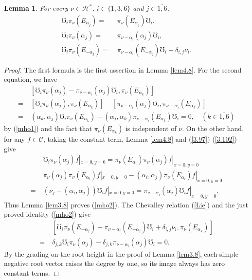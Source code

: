\documentclass[12pt]{article}
\numberwithin{equation}{section}
\newtheorem{lemma}[theorem]{Lemma}
\theoremstyle{definition}
\theoremstyle{remark}
\begin{document}
\begin{lemma}
	For every $\nu\in \mathscr{H}^*$, $i\in\{1,3,6\}$ and $j\in\overline{1,6}$,
	\begin{align}
		\mho_i\pi_{\nu}(E_{\alpha_j})=&\;\pi_{\nu}(E_{\alpha_j})\mho_i,\label{mho1}\\
		\mho_i\pi_{\nu}(\alpha_j)=&\;\pi_{\nu-\alpha_i}(\alpha_j)\mho_i,\label{mho2}\\
		\mho_i\pi_{\nu}(E_{-\alpha_j})=&\;\pi_{\nu-\alpha_i}(E_{-\alpha_j})\mho_i-\delta_{i,j}\nu_i.\label{mho3}
	\end{align}
\end{lemma}
\begin{proof}
	The first formula is the first assertion in Lemma \ref{lem4.8}. For the second equation, we have
	\begin{align}
		&\;[\mho_i\pi_{\nu}(\alpha_j)-\pi_{\nu-\alpha_i}(\alpha_j)\mho_i,\pi_\nu(E_{\alpha_k})]\nonumber\\
		=&\;[\mho_i\pi_{\nu}(\alpha_j),\pi_\nu(E_{\alpha_k})]-[\pi_{\nu-\alpha_i}(\alpha_j)\mho_i,\pi_{\nu-\alpha_i}(E_{\alpha_k})]\nonumber\\
		=&\;(\alpha_k,\alpha_j)\mho_i\pi_{\nu}(E_{\alpha_k})-(\alpha_j,\alpha_k)\pi_{\nu-\alpha_i}(E_{\alpha_k})\mho_i=0,\quad (k\in\overline{1,6})
	\end{align}
	by (\ref{mho1}) and the fact that $\pi_{\nu}(E_{\alpha_k})$ is independent of $\nu$. On the other hand, for any $f\in\mathscr{C}$, taking the constant term, Lemma \ref{lem4.8} and (\ref{3.97})-(\ref{3.102}) give
	\begin{align}
		&\;\mho_i\pi_{\nu}(\alpha_j)f|_{x=0,y=0}=\pi_\nu(E_{\alpha_i})\pi_{\nu}(\alpha_j)f|_{x=0,y=0}\nonumber\\
		=&\;\pi_{\nu}(\alpha_j)\pi_\nu(E_{\alpha_i})f|_{x=0,y=0}-(\alpha_i,\alpha_j)\pi_\nu(E_{\alpha_i})f|_{x=0,y=0}\nonumber\\
		=&\;(\nu_j-(\alpha_i,\alpha_j))\mho_if|_{x=0,y=0}=\pi_{\nu-\alpha_i}(\alpha_j)\mho_if|_{x=0,y=0}.
	\end{align}
	Thus Lemma {\ref{lem3.8}} proves (\ref{mho2}). The Chevalley relation (\ref{Lie}) and the just proved identity (\ref{mho2}) give
	\begin{align}
		&\;[\mho_i\pi_{\nu}(E_{-\alpha_j})-\pi_{\nu-\alpha_i}(E_{-\alpha_j})\mho_i+\delta_{i,j}\nu_i,\pi_\nu(E_{\alpha_k})]\nonumber\\
		=&\;\delta_{j,k}\mho_i\pi_{\nu}(\alpha_j)-\delta_{j,k}\pi_{\nu-\alpha_i}(\alpha_j)\mho_i=0.
	\end{align}
	By the grading on the root height in the proof of Lemma \ref{lem3.8}, each simple negative root vector raises the degree by one, so its image always has zero constant terms.

\end{proof}
\end{document}
